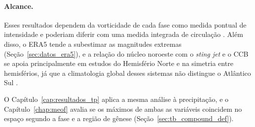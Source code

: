 \paragraph{Alcance.}
Esses resultados dependem da vorticidade de cada fase como medida pontual de intensidade e poderiam diferir com uma medida integrada de circulação \citep{sinclair1997objective}. Além disso, o ERA5 tende a subestimar as magnitudes extremas (Seção~\ref{sec:datos_era5}), e a relação do núcleo noroeste com o \textit{sting jet} e o CCB se apoia principalmente em estudos do Hemisfério Norte e na simetria entre hemisférios, já que a climatologia global desses sistemas não distingue o Atlântico Sul \citep{gray2024global}.

O Capítulo~\ref{cap:resultados_tp} aplica a mesma análise à precipitação, e o Capítulo~\ref{chap:meof} avalia se os máximos de ambas as variáveis coincidem no espaço segundo a fase e a região de gênese (Seção~\ref{sec:tb_compound_def}).
